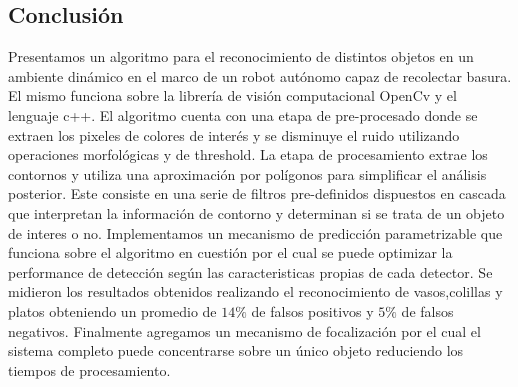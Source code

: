 \subsection{Conclusi\'on}
Presentamos un algoritmo para el reconocimiento de distintos objetos en 
un ambiente dinámico en el marco de un robot autónomo capaz de 
recolectar basura. El mismo funciona sobre la librería de visión 
computacional OpenCv y el lenguaje c++.  El algoritmo cuenta
con una etapa de pre-procesado donde se extraen los pixeles de colores de interés y se disminuye el ruido utilizando 
operaciones morfológicas y de threshold. La etapa de procesamiento extrae los contornos y utiliza una aproximación por polígonos
para simplificar el análisis posterior. Este consiste en una serie de 
filtros pre-definidos dispuestos en cascada que interpretan la 
información de contorno y  determinan si se trata 
de un objeto de interes o no. 
Implementamos un mecanismo de predicción parametrizable que funciona 
sobre el algoritmo en cuestión por el cual se puede optimizar la performance de 
detección según las caracteristicas propias de cada detector. Se 
midieron los resultados obtenidos realizando el reconocimiento de 
vasos,colillas y platos obteniendo un promedio de $14\%$ de falsos 
positivos  y $5\%$ de falsos negativos. Finalmente agregamos un mecanismo de focalización por el cual 
el sistema completo puede concentrarse sobre un único objeto reduciendo 
los tiempos de procesamiento. 


